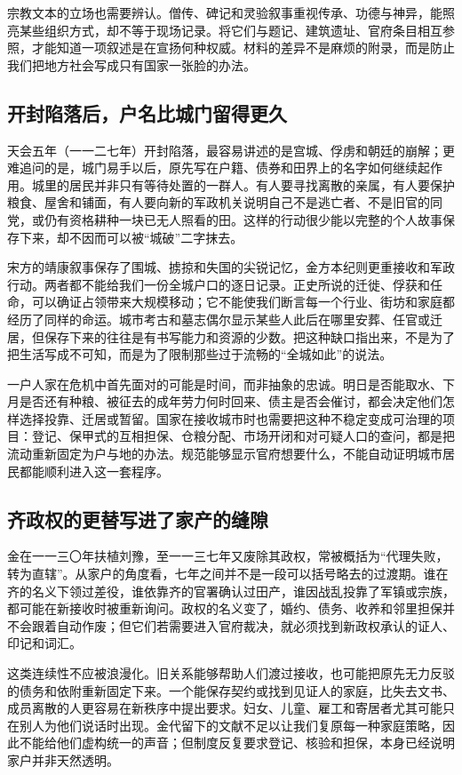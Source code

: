 宗教文本的立场也需要辨认。僧传、碑记和灵验叙事重视传承、功德与神异，能照亮某些组织方式，却不等于现场记录。将它们与题记、建筑遗址、官府条目相互参照，才能知道一项叙述是在宣扬何种权威。材料的差异不是麻烦的附录，而是防止我们把地方社会写成只有国家一张脸的办法。

\subsection{开封陷落后，户名比城门留得更久}

天会五年（一一二七年）开封陷落，最容易讲述的是宫城、俘虏和朝廷的崩解；更难追问的是，城门易手以后，原先写在户籍、债券和田界上的名字如何继续起作用。城里的居民并非只有等待处置的一群人。有人要寻找离散的亲属，有人要保护粮食、屋舍和铺面，有人要向新的军政机关说明自己不是逃亡者、不是旧官的同党，或仍有资格耕种一块已无人照看的田。这样的行动很少能以完整的个人故事保存下来，却不因而可以被“城破”二字抹去。

宋方的靖康叙事保存了围城、掳掠和失国的尖锐记忆，金方本纪则更重接收和军政行动。两者都不能给我们一份全城户口的逐日记录。正史所说的迁徙、俘获和任命，可以确证占领带来大规模移动；它不能使我们断言每一个行业、街坊和家庭都经历了同样的命运。城市考古和墓志偶尔显示某些人此后在哪里安葬、任官或迁居，但保存下来的往往是有书写能力和资源的少数。把这种缺口指出来，不是为了把生活写成不可知，而是为了限制那些过于流畅的“全城如此”的说法。

一户人家在危机中首先面对的可能是时间，而非抽象的忠诚。明日是否能取水、下月是否还有种粮、被征去的成年劳力何时回来、债主是否会催讨，都会决定他们怎样选择投靠、迁居或暂留。国家在接收城市时也需要把这种不稳定变成可治理的项目：登记、保甲式的互相担保、仓粮分配、市场开闭和对可疑人口的查问，都是把流动重新固定为户与地的办法。规范能够显示官府想要什么，不能自动证明城市居民都能顺利进入这一套程序。

\subsection{齐政权的更替写进了家产的缝隙}

金在一一三〇年扶植刘豫，至一一三七年又废除其政权，常被概括为“代理失败，转为直辖”。从家户的角度看，七年之间并不是一段可以括号略去的过渡期。谁在齐的名义下领过差役，谁依靠齐的官署确认过田产，谁因战乱投靠了军镇或宗族，都可能在新接收时被重新询问。政权的名义变了，婚约、债务、收养和邻里担保并不会跟着自动作废；但它们若需要进入官府裁决，就必须找到新政权承认的证人、印记和词汇。

这类连续性不应被浪漫化。旧关系能够帮助人们渡过接收，也可能把原先无力反驳的债务和依附重新固定下来。一个能保存契约或找到见证人的家庭，比失去文书、成员离散的人更容易在新秩序中提出要求。妇女、儿童、雇工和寄居者尤其可能只在别人为他们说话时出现。金代留下的文献不足以让我们复原每一种家庭策略，因此不能给他们虚构统一的声音；但制度反复要求登记、核验和担保，本身已经说明家户并非天然透明。


